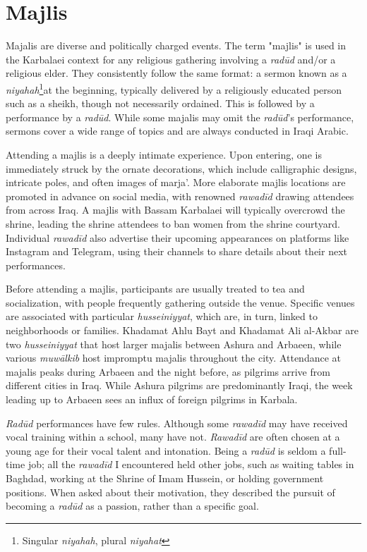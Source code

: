 \section{Majlis} \label{majlis}
Majalis are diverse and politically charged events. The term "majlis" is used in the Karbalaei context for any religious gathering involving a \emph{radūd} and/or a religious elder. They consistently follow the same format: a sermon known as a \emph{niyahah}\footnote{Singular \emph{niyahah}, plural \emph{niyahat}}at the beginning, typically delivered by a religiously educated person such as a sheikh, though not necessarily ordained. This is followed by a performance by a \emph{radūd}. While some majalis may omit the \emph{radūd}'s performance, sermons cover a wide range of topics and are always conducted in Iraqi Arabic.

Attending a majlis is a deeply intimate experience. Upon entering, one is immediately struck by the ornate decorations, which include calligraphic designs, intricate poles, and often images of marja'. More elaborate majlis locations are promoted in advance on social media, with renowned \emph{rawadīd} drawing attendees from across Iraq. A majlis with Bassam Karbalaei will typically overcrowd the shrine, leading the shrine attendees to ban women from the shrine courtyard. Individual \emph{rawadīd} also advertise their upcoming appearances on platforms like Instagram and Telegram, using their channels to share details about their next performances.

Before attending a majlis, participants are usually treated to tea and socialization, with people frequently gathering outside the venue. Specific venues are associated with particular \emph{husseiniyyat}, which are, in turn, linked to neighborhoods or families. Khadamat Ahlu Bayt and Khadamat Ali al-Akbar are two \emph{husseiniyyat} that host larger majalis between Ashura and Arbaeen, while various \emph{muwālkib} host impromptu majalis throughout the city. Attendance at majalis peaks during Arbaeen and the night before, as pilgrims arrive from different cities in Iraq. While Ashura pilgrims are predominantly Iraqi, the week leading up to Arbaeen sees an influx of foreign pilgrims in Karbala.

\emph{Radūd} performances have few rules. Although some \emph{rawadīd} may have received vocal training within a school, many have not. \emph{Rawadīd} are often chosen at a young age for their vocal talent and intonation. Being a \emph{radūd} is seldom a full-time job; all the \emph{rawadīd} I encountered held other jobs, such as waiting tables in Baghdad, working at the Shrine of Imam Hussein, or holding government positions. When asked about their motivation, they described the pursuit of becoming a \emph{radūd} as a passion, rather than a specific goal.


